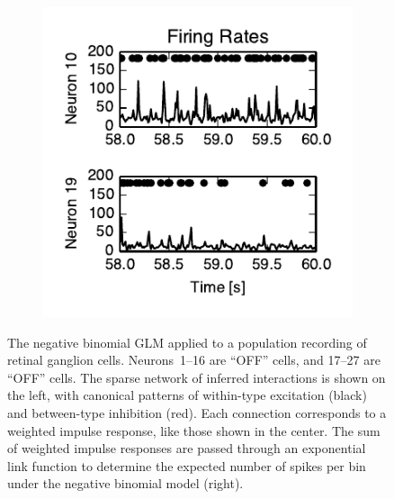 \documentclass[aos,noinfoline]{imsart} %
\begin{document}
\begin{figure}[t!]
\begin{subfigure}[T]{2.2in}
    \includegraphics[width=\textwidth]{figure1b}
  \end{subfigure}
\vspace{-2.5em}
\caption{The negative binomial GLM applied to a population recording of retinal ganglion cells. Neurons~1--16 are ``OFF'' cells, and 17--27 are ``OFF'' cells.  The sparse network of inferred interactions is shown on the left, with canonical patterns of within-type excitation (black) and between-type inhibition (red). Each connection corresponds to a weighted impulse response, like those shown in the center. The sum of weighted impulse responses are passed through an exponential link function to determine the expected number of spikes per bin under the negative binomial model (right). }
\label{fig:figure1}
\vspace{-1.5em}
\end{figure}
\end{document}
